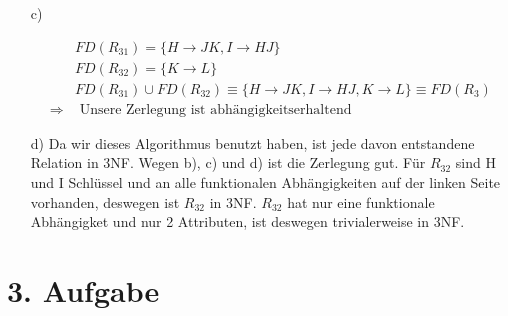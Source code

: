 \begin{enumerate}
\item[c)]

\begin{align*}
    & FD(R_{31}) = \{ H \rightarrow JK, I \rightarrow HJ \} \\
    & FD(R_{32}) = \{ K \rightarrow L \} \\
    & FD(R_{31}) \cup FD(R_{32}) \equiv \{ H \rightarrow JK, I \rightarrow HJ, K \rightarrow L \} \equiv FD(R_3) \\
    \Rightarrow & \text{ Unsere Zerlegung ist abhängigkeitserhaltend}
\end{align*}

\item[d)]
Da wir dieses Algorithmus benutzt haben, ist jede davon entstandene Relation in 3NF. Wegen b), c) und d) ist die Zerlegung gut. Für $R_{32}$ sind H und I Schlüssel und an alle funktionalen Abhängigkeiten auf der linken Seite vorhanden, deswegen ist $R_{32}$ in 3NF. $R_{32}$ hat nur eine funktionale Abhängigket und nur 2 Attributen, ist deswegen trivialerweise in 3NF.


\end{enumerate}

\section*{3. Aufgabe}

